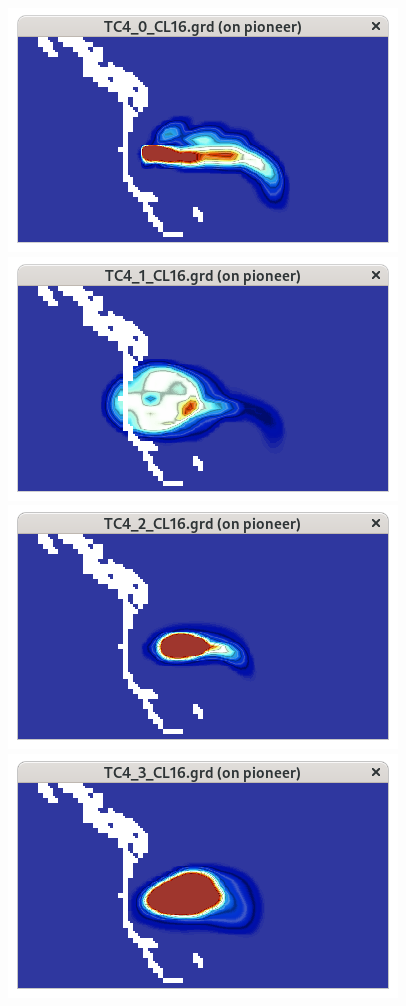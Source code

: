 \begin{figure}[htbp]\vspace*{0cm}\hspace*{0cm}
\includegraphics[angle=0,scale=0.6]{Figures/Apx_Test/Test_040_CL.png}
\includegraphics[angle=0,scale=0.6]{Figures/Apx_Test/Test_041_CL.png}
\includegraphics[angle=0,scale=0.6]{Figures/Apx_Test/Test_042_CL.png}
\includegraphics[angle=0,scale=0.6]{Figures/Apx_Test/Test_043_CL.png}

\end{figure}
